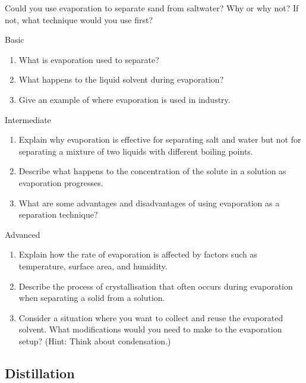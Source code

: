 \begin{stopandthink}
Could you use evaporation to separate sand from saltwater? Why or why not? If not, what technique would you use first?
\end{stopandthink}

\begin{tieredquestions}{Basic}
\begin{enumerate}
    \item What is evaporation used to separate?
    \item What happens to the liquid solvent during evaporation?
    \item Give an example of where evaporation is used in industry.
\end{enumerate}
\end{tieredquestions}

\begin{tieredquestions}{Intermediate}
\begin{enumerate}
    \item Explain why evaporation is effective for separating salt and water but not for separating a mixture of two liquids with different boiling points.
    \item Describe what happens to the concentration of the solute in a solution as evaporation progresses.
    \item  What are some advantages and disadvantages of using evaporation as a separation technique?
\end{enumerate}
\end{tieredquestions}

\begin{tieredquestions}{Advanced}
\begin{enumerate}
    \item  Explain how the rate of evaporation is affected by factors such as temperature, surface area, and humidity.
    \item  Describe the process of crystallisation that often occurs during evaporation when separating a solid from a solution.
    \item  Consider a situation where you want to collect and reuse the evaporated solvent. What modifications would you need to make to the evaporation setup? (Hint: Think about condensation.)
\end{enumerate}
\end{tieredquestions}


\subsection{Distillation}

